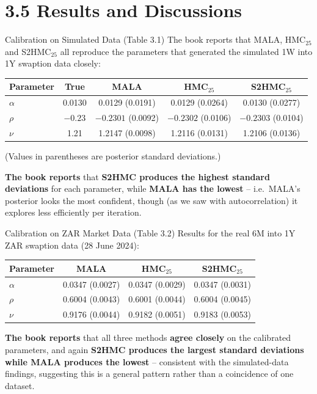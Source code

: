\documentclass[aspectratio=169,10pt]{beamer}
\begin{document}
\section{3.5 Results and Discussions}

\begin{frame}{Calibration on Simulated Data (Table 3.1)}
  \small
  The book reports that MALA, HMC$_{25}$ and S2HMC$_{25}$ all reproduce the
  parameters that generated the simulated 1W into 1Y swaption data closely:
  \begin{table}[]
    \centering
    \begin{tabular}{lcccc}
      \toprule
      Parameter & True & MALA & HMC$_{25}$ & S2HMC$_{25}$ \\
      \midrule
      $\alpha$ & 0.0130 & 0.0129 (0.0191) & 0.0129 (0.0264) & 0.0130 (0.0277) \\
      $\rho$   & $-0.23$ & $-0.2301$ (0.0092) & $-0.2302$ (0.0106) & $-0.2303$ (0.0104) \\
      $\nu$    & 1.21 & 1.2147 (0.0098) & 1.2116 (0.0131) & 1.2106 (0.0136) \\
      \bottomrule
    \end{tabular}
  \end{table}
  \footnotesize (Values in parentheses are posterior standard deviations.)

  \vspace{2mm}
  \normalsize \textbf{The book reports} that \textbf{S2HMC produces the
  highest standard deviations} for each parameter, while \textbf{MALA has the
  lowest} -- i.e.\ MALA's posterior looks the most confident, though (as we
  saw with autocorrelation) it explores less efficiently per iteration.
\end{frame}

\begin{frame}{Calibration on ZAR Market Data (Table 3.2)}
  \small
  Results for the real 6M into 1Y ZAR swaption data (28 June 2024):
  \begin{table}[]
    \centering
    \begin{tabular}{lccc}
      \toprule
      Parameter & MALA & HMC$_{25}$ & S2HMC$_{25}$ \\
      \midrule
      $\alpha$ & 0.0347 (0.0027) & 0.0347 (0.0029) & 0.0347 (0.0031) \\
      $\rho$   & 0.6004 (0.0043) & 0.6001 (0.0044) & 0.6004 (0.0045) \\
      $\nu$    & 0.9176 (0.0044) & 0.9182 (0.0051) & 0.9183 (0.0053) \\
      \bottomrule
    \end{tabular}
  \end{table}
  \normalsize \textbf{The book reports} that all three methods \textbf{agree
  closely} on the calibrated parameters, and again \textbf{S2HMC produces the
  largest standard deviations while MALA produces the lowest} -- consistent
  with the simulated-data findings, suggesting this is a general pattern
  rather than a coincidence of one dataset.
\end{frame}
\end{document}
